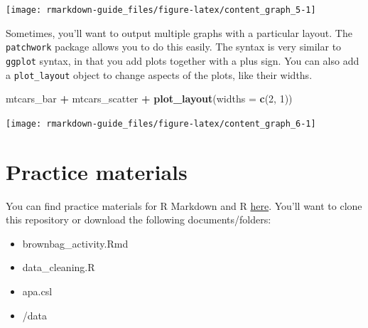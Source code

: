 \documentclass[
  openany]{book}
\newenvironment{Shaded}{\begin{snugshade}}{\end{snugshade}}
\newcommand{\DataTypeTok}[1]{\textcolor[rgb]{0.13,0.29,0.53}{#1}}
\newcommand{\DecValTok}[1]{\textcolor[rgb]{0.00,0.00,0.81}{#1}}
\newcommand{\KeywordTok}[1]{\textcolor[rgb]{0.13,0.29,0.53}{\textbf{#1}}}
\newcommand{\NormalTok}[1]{#1}
\newcommand{\OperatorTok}[1]{\textcolor[rgb]{0.81,0.36,0.00}{\textbf{#1}}}
\newcommand{\StringTok}[1]{\textcolor[rgb]{0.31,0.60,0.02}{#1}}
\providecommand{\tightlist}{%
  \setlength{\itemsep}{0pt}\setlength{\parskip}{0pt}}
\begin{document}
\texttt{[image: rmarkdown-guide\_files/figure-latex/content\_graph\_5-1]}

Sometimes, you'll want to output multiple graphs with a particular layout. The \texttt{patchwork} package allows you to do this easily. The syntax is very similar to \texttt{ggplot} syntax, in that you add plots together with a plus sign. You can also add a \texttt{plot\_layout} object to change aspects of the plots, like their widths.

\begin{Shaded}
\begin{Highlighting}[]
\NormalTok{ mtcars_bar }\OperatorTok{+}\StringTok{ }\NormalTok{mtcars_scatter }\OperatorTok{+}\StringTok{ }\KeywordTok{plot_layout}\NormalTok{(}\DataTypeTok{widths =} \KeywordTok{c}\NormalTok{(}\DecValTok{2}\NormalTok{, }\DecValTok{1}\NormalTok{))}
\end{Highlighting}
\end{Shaded}

\texttt{[image: rmarkdown-guide\_files/figure-latex/content\_graph\_6-1]}

\hypertarget{practice-materials}{%
\section{Practice materials}\label{practice-materials}}

You can find practice materials for R Markdown and R \href{https://github.com/hollzzar/markdown-tutorial}{here}. You'll want to clone this repository or download the following documents/folders:

\begin{itemize}
\tightlist
\item
  brownbag\_activity.Rmd
\item
  data\_cleaning.R
\item
  apa.csl
\item
  /data
\end{itemize}

  
\end{document}
